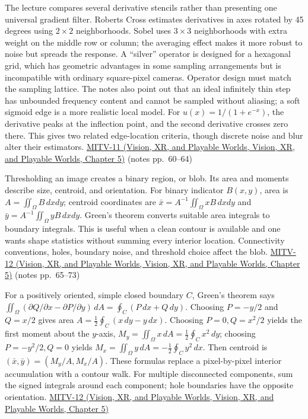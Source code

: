 The lecture compares several derivative stencils rather than presenting one universal gradient filter. Roberts Cross estimates derivatives in axes rotated by 45 degrees using \(2\times2\) neighborhoods. Sobel uses \(3\times3\) neighborhoods with extra weight on the middle row or column; the averaging effect makes it more robust to noise but spreads the response. A ``silver'' operator is designed for a hexagonal grid, which has geometric advantages in some sampling arrangements but is incompatible with ordinary square-pixel cameras. Operator design must match the sampling lattice. The notes also point out that an ideal infinitely thin step has unbounded frequency content and cannot be sampled without aliasing; a soft sigmoid edge is a more realistic local model. For \(u(x)=1/(1+e^{-x})\), the derivative peaks at the inflection point, and the second derivative crosses zero there. This gives two related edge-location criteria, though discrete noise and blur alter their estimators. \href{../07-Vision-XR-and-Playable-Worlds/main.pdf\#nameddest=04-visual-computing-ii-ch036-mitv-11---edge-detection-subpixel-position-cordic-line-detection-us-6408109}{MITV-11 (Vision, XR, and Playable Worlds, Vision, XR, and Playable Worlds, Chapter 5)} (notes pp.~60--64)

Thresholding an image creates a binary region, or blob. Its area and moments describe size, centroid, and orientation. For binary indicator \(B(x,y)\), area is \(A=\iint_\Omega B\,dxdy\); centroid coordinates are \(\bar{x}=A^{-1}\iint_\Omega xB\,dxdy\) and \(\bar{y}=A^{-1}\iint_\Omega yB\,dxdy\). Green's theorem converts suitable area integrals to boundary integrals. This is useful when a clean contour is available and one wants shape statistics without summing every interior location. Connectivity conventions, holes, boundary noise, and threshold choice affect the blob. \href{../07-Vision-XR-and-Playable-Worlds/main.pdf\#nameddest=04-visual-computing-ii-ch036-mitv-12---blob-analysis-binary-image-processing-greens-theorem-derivative-and-integral}{MITV-12 (Vision, XR, and Playable Worlds, Vision, XR, and Playable Worlds, Chapter 5)} (notes pp.~65--73)

For a positively oriented, simple closed boundary \(C\), Green's theorem says \(\iint_\Omega(\partial Q/\partial x-\partial P/\partial y)\,dA=\oint_C(P\,dx+Q\,dy)\). Choosing \(P=-y/2\) and \(Q=x/2\) gives area \(A=\frac12\oint_C(x\,dy-y\,dx)\). Choosing \(P=0,Q=x^2/2\) yields the first moment about the \(y\)-axis, \(M_y=\iint_\Omega x\,dA=\frac12\oint_Cx^2\,dy\); choosing \(P=-y^2/2,Q=0\) yields \(M_x=\iint_\Omega y\,dA=-\frac12\oint_Cy^2\,dx\). Then centroid is \((\bar{x},\bar{y})=(M_y/A,M_x/A)\). These formulas replace a pixel-by-pixel interior accumulation with a contour walk. For multiple disconnected components, sum the signed integrals around each component; hole boundaries have the opposite orientation. \href{../07-Vision-XR-and-Playable-Worlds/main.pdf\#nameddest=04-visual-computing-ii-ch036-mitv-12---blob-analysis-binary-image-processing-greens-theorem-derivative-and-integral}{MITV-12 (Vision, XR, and Playable Worlds, Vision, XR, and Playable Worlds, Chapter 5)}

